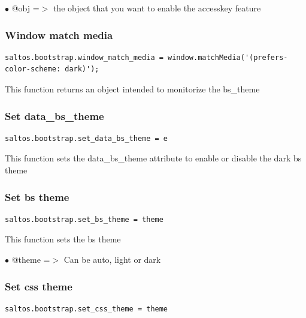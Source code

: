\documentclass[a4paper]{article}
\begin{document}
\begin{compactitem}
\item[\color{myblue}$\bullet$] @obj =$>$ the object that you want to enable the accesskey feature
\end{compactitem}

\hypertarget{toc110}{}
\subsubsection{Window match media}

\begin{lstlisting}
saltos.bootstrap.window_match_media = window.matchMedia('(prefers-color-scheme: dark)');
\end{lstlisting}

This function returns an object intended to monitorize the bs\_theme

\hypertarget{toc111}{}
\subsubsection{Set data\_bs\_theme}

\begin{lstlisting}
saltos.bootstrap.set_data_bs_theme = e
\end{lstlisting}

This function sets the data\_bs\_theme attribute to enable or disable the dark bs theme

\hypertarget{toc112}{}
\subsubsection{Set bs theme}

\begin{lstlisting}
saltos.bootstrap.set_bs_theme = theme
\end{lstlisting}

This function sets the bs theme

\begin{compactitem}
\item[\color{myblue}$\bullet$] @theme =$>$ Can be auto, light or dark
\end{compactitem}

\hypertarget{toc113}{}
\subsubsection{Set css theme}

\begin{lstlisting}
saltos.bootstrap.set_css_theme = theme
\end{lstlisting}
\end{document}
